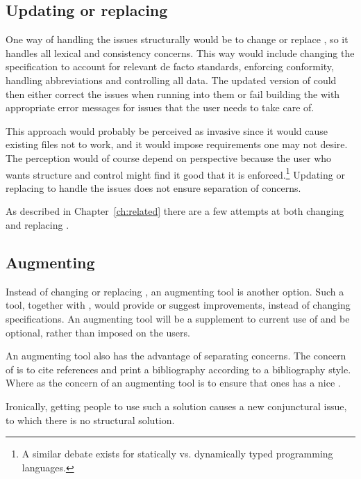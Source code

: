 \subsection{Updating or replacing {\bibtex}}
\label{sec:approach_replacing_bibtex}

One way of handling the issues structurally would be to change or
replace {\bibtex}, so it handles all lexical and consistency concerns.
This way would include changing the {\bibtex} specification to account
for relevant de facto standards, enforcing conformity, handling
abbreviations and controlling all data.  The updated version of
{\bibtex} could then either correct the issues when running into them
or fail building the  with appropriate error messages for
issues that the user needs to take care of.

This approach would probably be perceived as invasive since it would
cause existing {\bibtex} files not to work, and it would impose
requirements one may not desire.  The perception would of course
depend on perspective because the user who wants structure and control
might find it good that it is enforced.\footnote{A similar debate
  exists for statically vs. dynamically typed programming languages.}
Updating or replacing {\bibtex} to handle the issues does not ensure
separation of concerns.

As described in Chapter~\ref{ch:related} there are a few attempts at
both changing and replacing {\bibtex}.


\subsection{Augmenting {\bibtex}}
\label{sec:approach_augmenting_bibtex}

Instead of changing or replacing {\bibtex}, an augmenting tool is
another option.  Such a tool, together with {\bibtex}, would provide
or suggest improvements, instead of changing specifications.  An
augmenting tool will be a supplement to current use of {\bibtex} and
be optional, rather than imposed on the users.

An augmenting tool also has the advantage of separating concerns.  The
concern of {\bibtex} is to cite references and print a bibliography
according to a bibliography style.  Where as the concern of an
augmenting tool is to ensure that ones has a nice .

Ironically, getting people to use such a solution causes a new
conjunctural issue, to which there is no structural solution.

